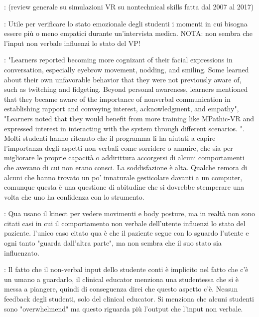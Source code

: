 \cite{bracq2019virtual}: (review generale su simulazioni VR su nontechnical skills fatta dal 2007 al 2017)



\cite{dupuy2019virtual}: Utile per verificare lo stato emozionale degli studenti i momenti in cui bisogna essere più o meno empatici durante un'intervista medica. NOTA: non sembra che l'input non verbale influenzi lo stato del VP!

\cite{guetterman2019medical, kron2017using}: "Learners reported becoming more cognizant of their facial expressions in conversation, especially eyebrow movement, nodding, and smiling. Some learned about their own unfavorable behavior that they were not previously aware of, such as twitching and fidgeting. Beyond personal awareness, learners mentioned that they became aware of the importance of nonverbal communication in establishing rapport and conveying interest, acknowledgment, and empathy", "Learners noted that they would benefit from more training like MPathic-VR and expressed interest in interacting with the system through different scenarios. ". Molti studenti hanno ritenuto che il programma li ha aiutati a capire l'importanza degli aspetti non-verbali come sorridere o annuire, che sia per migliorare le proprie capacità o addirittura accorgersi di alcuni comportamenti che avevano di cui non erano consci. La soddisfazione è alta. Qualche remora di alcuni che hanno trovato un po' innaturale gesticolare davanti a un computer, comunque questa è una questione di abitudine che si dovrebbe stemperare una volta che uno ha confidenza con lo strumento.

\cite{maicher2017developing}: Qua usano il kinect per vedere movimenti e body posture, ma in realtà non sono citati casi in cui il comportamento non verbale dell'utente influenzi lo stato del paziente. l'unico caso citato qua è che il paziente segue con lo sguardo l'utente e ogni tanto "guarda dall'altra parte", ma non sembra che il suo stato sia influenzato.

\cite{banszki2018clinical}: Il fatto che il non-verbal input dello studente conti è implicito nel fatto che c'è un umano a guardarlo, il clinical educator menziona una studentessa che si è messa a piangere, quindi di conseguenza direi che questo aspetto c'è. Nessun feedback degli studenti, solo del clinical educator. Si menziona che alcuni studenti sono "overwhelmend" ma questo riguarda più l'output che l'input non verbale.


